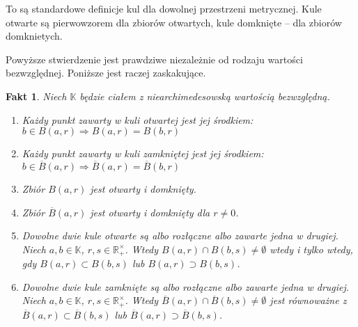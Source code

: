 \documentclass[a4paper,fleqn,9pt]{extarticle}
\newtheorem{fkt}{Fakt}
\newenvironment{enumx}{\begin{enumerate}
	\setlength{\itemsep}{0pt}
	\setlength{\parskip}{0pt}
	\setlength{\parsep}{0pt}}
{\end{enumerate}}
\begin{document}
To są standardowe definicje kul dla dowolnej przestrzeni metrycznej. Kule otwarte są pierwowzorem dla zbiorów otwartych, kule domknięte -- dla zbiorów domknietych.

Powyższe stwierdzenie jest prawdziwe niezależnie od rodzaju wartości bezwzględnej. Poniższe jest raczej zaskakujące.

\begin{fkt}Niech $\mathbb K$ będzie ciałem z niearchimedesowską wartością bezwzględną.

\begin{enumx}
\item Każdy punkt zawarty w kuli otwartej jest jej środkiem: $b\in B(a,r) \Rightarrow B(a,r) = B(b,r)$
\item Każdy punkt zawarty w kuli zamkniętej jest jej środkiem: $b\in \overline{B}(a,r) \Rightarrow \overline{B}(a,r) = \overline{B}(b,r)$
\item Zbiór $B(a,r)$ jest otwarty i domknięty.
\item Zbiór $\overline{B}(a,r)$ jest otwarty i domknięty dla $r\neq 0$.
\item Dowolne dwie kule otwarte są albo rozłączne albo zawarte jedna w drugiej. Niech $a,b\in\mathbb K$, $r,s\in\mathbb R_+^\times$. Wtedy $B(a,r) \cap B(b,s) \neq \emptyset$ wtedy i tylko wtedy, gdy $B(a,r) \subset B(b,s)$ lub $B(a,r) \supset B(b,s)$.
\item Dowolne dwie kule zamknięte są albo rozłączne albo zawarte jedna w drugiej. Niech $a,b\in\mathbb K$, $r,s\in\mathbb R_+^\times$. Wtedy $\overline{B}(a,r) \cap \overline{B}(b,s) \neq \emptyset$ jest równoważne z $\overline{B}(a,r) \subset \overline{B}(b,s)$ lub $\overline{B}(a,r) \supset \overline{B}(b,s)$.
\end{enumx}\end{fkt}
\end{document}
